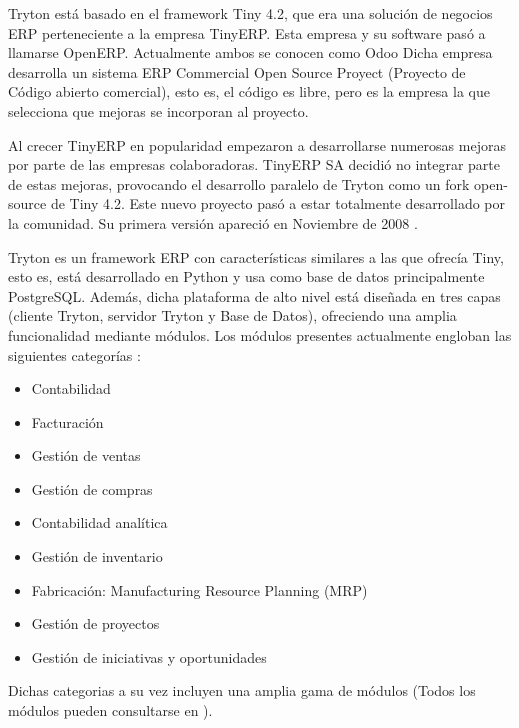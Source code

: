 \documentclass{article}
\begin{document}
Tryton está basado en el framework Tiny 4.2, que era una solución de negocios ERP perteneciente a la empresa TinyERP. Esta empresa y su software pasó a llamarse OpenERP. Actualmente ambos se conocen como Odoo Dicha empresa desarrolla un sistema ERP Commercial Open Source Proyect (Proyecto de Código abierto comercial), esto es, el código es libre, pero es la empresa la que selecciona que mejoras se incorporan al proyecto.

Al crecer TinyERP en popularidad empezaron a desarrollarse numerosas mejoras por parte de las empresas colaboradoras. TinyERP SA decidió no integrar parte de estas mejoras, provocando el desarrollo paralelo de Tryton como un fork open-source de Tiny 4.2. Este nuevo proyecto pasó a estar totalmente desarrollado por la comunidad. Su primera versión apareció en Noviembre de 2008 \cite{que-es-tryton}.

Tryton es un framework ERP con características similares a las que ofrecía Tiny, esto es, está desarrollado en Python y usa como base de datos principalmente PostgreSQL. Además, dicha plataforma de alto nivel está diseñada en tres capas (cliente Tryton, servidor Tryton y Base de Datos), ofreciendo una amplia funcionalidad mediante módulos. Los módulos presentes actualmente engloban las siguientes categorías \cite{tryton}:

\begin{itemize}
    \item Contabilidad
    \item Facturación
    \item Gestión de ventas
    \item Gestión de compras
    \item Contabilidad analítica
    \item Gestión de inventario
    \item Fabricación: Manufacturing Resource Planning (MRP)
    \item Gestión de proyectos
    \item Gestión de iniciativas y oportunidades
\end{itemize}

Dichas categorias a su vez incluyen una amplia gama de módulos (Todos los módulos pueden consultarse en \cite{modulos}).

\end{document}
